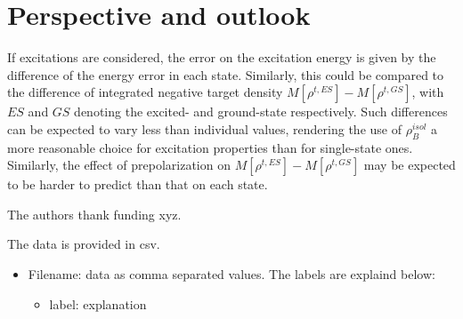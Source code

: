 \documentclass[journal=jctcce,manuscript=article, layout=twocolumn]{achemso}
\begin{document}
\section{Perspective and outlook}
If excitations are considered, the error on the excitation energy is given by the difference of the energy error in each state. 
Similarly, this could be compared to the difference of integrated negative target density $M[\rho^{t, ES}] - M[\rho^{t, GS}]$, with $ES$ and $GS$ denoting the excited- and ground-state respectively.
Such differences can be expected to vary less than individual values, rendering the use of $\rho_B^{isol}$ a more reasonable choice for excitation properties than for single-state ones.
Similarly, the effect of prepolarization on $M[\rho^{t, ES}] - M[\rho^{t, GS}]$ may be expected to be harder to predict than that on each state. 

\begin{acknowledgement}
The authors thank funding xyz.
\end{acknowledgement}

\begin{suppinfo}
The data is provided in csv.
\begin{itemize}
  \item Filename: data as comma separated values. The labels are explaind below:
  \begin{itemize}
   \item label: explanation
  \end{itemize}


\end{itemize}

\end{suppinfo}


\end{document}
